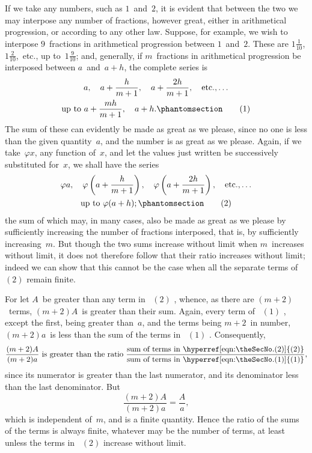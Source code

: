 \documentclass[12pt]{book}[2005/09/16]
\newcommand{\Chg}[2]{#2}
\newcommand{\Add}[1]{\Chg{}{#1}}
\newcounter{SecNo}
\newcommand{\Pagelabel}[1]{\phantomsection\label{page:#1}}
\newcommand{\PageSep}[1]{\Pagelabel{#1}\ignorespaces}
\renewcommand{\etc}{\text{etc}}
\renewcommand{\(}{{\upshape(}}
\renewcommand{\)}{{\upshape)}}
\renewcommand{\phi}{\varphi}
\newcommand{\Tag}[1]{%
  \phantomsection\label{eqn:\theSecNo.#1}\tag*{\ensuremath{#1}}%
}
\newcommand{\Eq}[2][\theSecNo]{%
  \hyperref[eqn:#1.#2]{\ensuremath{#2}}%
}
\begin{document}
If we take any numbers, such as $1$~and~$2$, it is evident
that between the two we may interpose any number
of fractions, however great, either in arithmetical
progression, or according to any other law. Suppose,
for example, we wish to interpose $9$~fractions in arithmetical
progression between $1$~and~$2$. These are $1\frac{1}{10}$,
$1\frac{2}{10}$,~etc., up to~$1\frac{9}{10}$; and, generally, if $m$~fractions in
arithmetical progression be interposed between $a$~and~$a + h$,
the complete series is
\PageSep{117}
\begin{multline*}
a,\quad a + \frac{h}{m + 1},\quad
        a + \frac{2h}{m + 1},\quad \etc.\Add{,} \dots\\
\text{up to } a + \frac{mh}{m + 1},\quad a + h\Add{.}
\Tag{(1)}
\end{multline*}
The sum of these can evidently be made as great as
we please, since no one is less than the given quantity~$a$,
and the number is as great as we please. Again,
if we take~$\phi x$, any function of~$x$, and let the values
just written be successively substituted for~$x$, we shall
have the series
\begin{multline*}
\phi a,\quad \phi\left(a + \frac{h}{m + 1}\right),\quad
  \phi\left(a + \frac{2h}{m + 1}\right),\quad \etc.\Add{,} \dots\\
\text{up to } \phi(a + h);
\Tag{(2)}
\end{multline*}
the sum of which may, in many cases, also be made
as great as we please by sufficiently increasing the
number of fractions interposed, that is, by sufficiently
increasing~$m$. But though the two sums increase without
limit when $m$~increases without limit, it does not
therefore follow that their ratio increases without
limit; indeed we can show that this cannot be the
case when all the separate terms of~\Eq{(2)} remain finite.

For let $A$~be greater than any term in~\Eq{(2)}, whence,
as there are $(m + 2)$~terms, $(m + 2)A$~is greater than
their sum. Again, every term of~\Eq{(1)}, except the first,
being greater than~$a$, and the terms being $m + 2$~in
number, $(m + 2)a$~is less than the sum of the terms in~\Eq{(1)}.
Consequently,
\[
\frac{(m + 2)A}{(m + 2)a}
  \text{ is greater than the ratio }
  \frac{\text{sum of terms in~\Eq{(2)}}}{\text{sum of terms in~\Eq{(1)}}},
\]
since its numerator is greater than the last numerator,
and its denominator less than the last denominator.
But
\PageSep{118}
\[
\frac{(m + 2)A}{(m + 2)a} = \frac{A}{a},
\]
which is independent of~$m$, and is a finite quantity.
Hence the ratio of the sums of the terms is always
finite, whatever may be the number of terms, at least
unless the terms in~\Eq{(2)} increase without limit.
\end{document}

